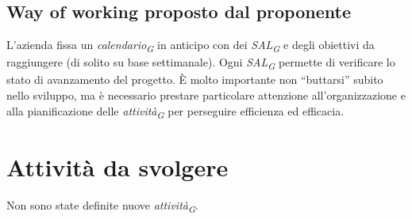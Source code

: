 \documentclass{article}
\begin{document}
    \subsection{Way of working proposto dal proponente}
        L’azienda fissa un \textit{calendario}\textsubscript{\textit{G}} in anticipo con dei \textit{SAL}\textsubscript{\textit{G}} e degli obiettivi da raggiungere (di solito su base settimanale).
        Ogni \textit{SAL}\textsubscript{\textit{G}} permette di verificare lo stato di avanzamento del progetto. 
        È molto importante non “buttarsi” subito nello sviluppo, ma è necessario prestare particolare attenzione all’organizzazione e alla pianificazione delle \textit{attività}\textsubscript{\textit{G}} per perseguire efficienza ed efficacia. 

\section{Attività da svolgere}
    Non sono state definite nuove \textit{attività}\textsubscript{\textit{G}}. 
\end{document}
